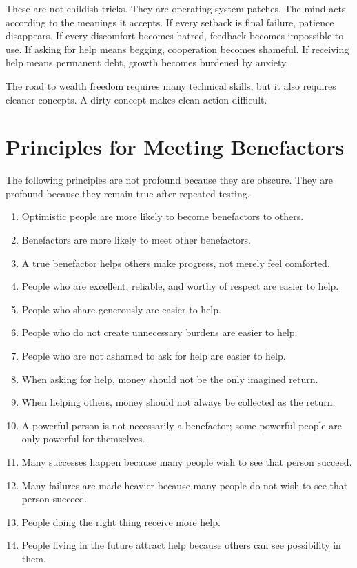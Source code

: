 These are not childish tricks. They are operating-system patches. The mind acts according to the meanings it accepts. If every setback is final failure, patience disappears. If every discomfort becomes hatred, feedback becomes impossible to use. If asking for help means begging, cooperation becomes shameful. If receiving help means permanent debt, growth becomes burdened by anxiety.

The road to wealth freedom requires many technical skills, but it also requires cleaner concepts. A dirty concept makes clean action difficult.

\section*{Principles for Meeting Benefactors}

The following principles are not profound because they are obscure. They are profound because they remain true after repeated testing.

\begin{enumerate}
\item Optimistic people are more likely to become benefactors to others.
\item Benefactors are more likely to meet other benefactors.
\item A true benefactor helps others make progress, not merely feel comforted.
\item People who are excellent, reliable, and worthy of respect are easier to help.
\item People who share generously are easier to help.
\item People who do not create unnecessary burdens are easier to help.
\item People who are not ashamed to ask for help are easier to help.
\item When asking for help, money should not be the only imagined return.
\item When helping others, money should not always be collected as the return.
\item A powerful person is not necessarily a benefactor; some powerful people are only powerful for themselves.
\item Many successes happen because many people wish to see that person succeed.
\item Many failures are made heavier because many people do not wish to see that person succeed.
\item People doing the right thing receive more help.
\item People living in the future attract help because others can see possibility in them.
\end{enumerate}

